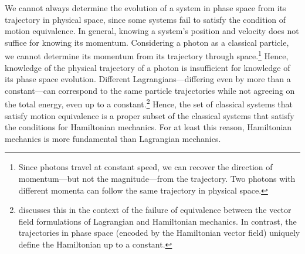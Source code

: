 \documentclass[12pt, english, twoside]{article} %
\begin{document}
We cannot always determine the evolution of a system in phase space from its trajectory in physical space, since some systems fail to satisfy the condition of motion equivalence. In general, knowing a system's position and velocity does not suffice for knowing its momentum. Considering a photon as a classical particle, we cannot determine its momentum from its trajectory through space.\footnote{Since photons travel at constant speed, we can recover the direction of momentum---but not the magnitude---from the trajectory. Two photons with different momenta can follow the same trajectory in physical space.} Hence, knowledge of the physical trajectory of a photon is insufficient for knowledge of its phase space evolution. Different Lagrangians---differing even by more than a constant---can correspond to the same particle trajectories while not agreeing on the total energy, even up to a constant.\footnote{\textcites[1185--1186]{Barrett2} discusses this in the context of the failure of equivalence between the vector field formulations of Lagrangian and Hamiltonian mechanics. In contrast, the trajectories in phase space (encoded by the Hamiltonian vector field) uniquely define the Hamiltonian up to a constant.} Hence, the set of classical systems that satisfy motion equivalence is a proper subset of the classical systems that satisfy the conditions for Hamiltonian mechanics. For at least this reason, Hamiltonian mechanics is more fundamental than Lagrangian mechanics.
\end{document}
